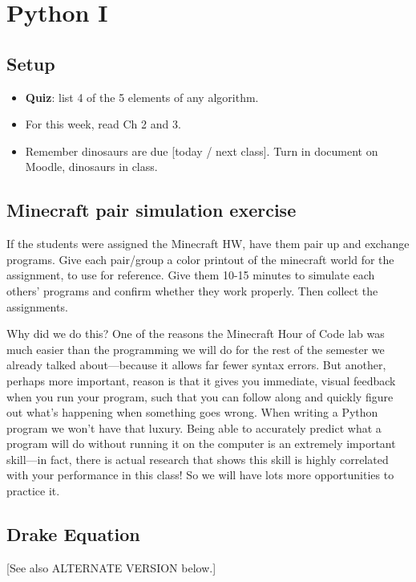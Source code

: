 \documentclass{article}
\begin{document}
\section{Python I}

\subsection*{Setup}

\begin{itemize}
\item \textbf{Quiz}: list 4 of the 5 elements of any algorithm.
\item For this week, read Ch 2 and 3.
\item Remember dinosaurs are due [today / next class].  Turn in
  document on Moodle, dinosaurs in class.
\end{itemize}

\subsection*{Minecraft pair simulation exercise}

If the students were assigned the Minecraft HW, have them pair up and
exchange programs.  Give each pair/group a color printout of the
minecraft world for the assignment, to use for reference.  Give them
10-15 minutes to simulate each others' programs and confirm whether
they work properly.  Then collect the assignments.

Why did we do this?  One of the reasons the Minecraft Hour of Code lab
was much easier than the programming we will do for the rest of the
semester we already talked about---because it allows far fewer syntax
errors.  But another, perhaps more important, reason is that it gives
you immediate, visual feedback when you run your program, such that
you can follow along and quickly figure out what's happening when
something goes wrong.  When writing a Python program we won't have
that luxury.  Being able to accurately predict what a program will do
without running it on the computer is an extremely important
skill---in fact, there is actual research that shows this skill is
highly correlated with your performance in this class!  So we will
have lots more opportunities to practice it.

\subsection*{Drake Equation}

[See also ALTERNATE VERSION below.]
\end{document}
